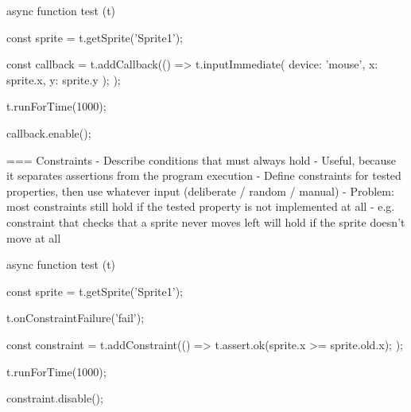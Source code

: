\begin{javascriptcode}
    async function test (t) {
        const sprite = t.getSprite('Sprite1');

        const callback = t.addCallback(() => {
            t.inputImmediate({
                device: 'mouse',
                x: sprite.x,
                y: sprite.y
            });
        });

        t.runForTime(1000);

        callback.enable();
    }
\end{javascriptcode}


=== Constraints
- Describe conditions that must always hold
- Useful, because it separates assertions from the program execution
    - Define constraints for tested properties, then use whatever input (deliberate / random / manual)
    - Problem: most constraints still hold if the tested property is not implemented at all
        - e.g. constraint that checks that a sprite never moves left will hold if the sprite doesn't move at all


\begin{javascriptcode}
    async function test (t) {
        const sprite = t.getSprite('Sprite1');

        t.onConstraintFailure('fail');

        const constraint = t.addConstraint(() => {
            t.assert.ok(sprite.x >= sprite.old.x);
        });

        t.runForTime(1000);

        constraint.disable();
    }
\end{javascriptcode}

